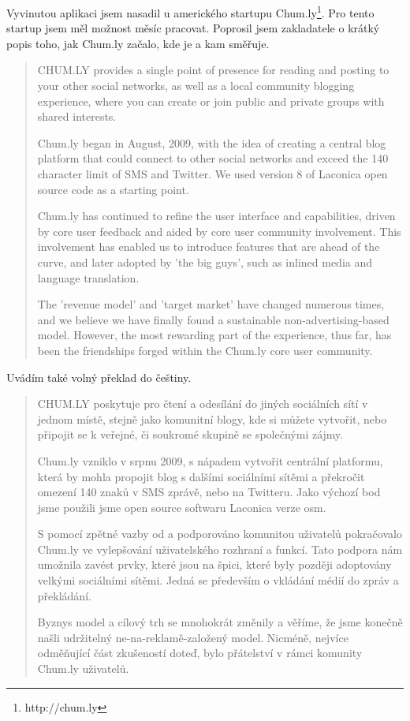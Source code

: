 \documentclass[bc,male,java,dept456]{diploma}						%
\begin{document}
Vyvinutou aplikaci jsem nasadil u amerického startupu Chum.ly\footnote{http://chum.ly}. Pro tento startup jsem měl možnost měsíc pracovat. Poprosil jsem zakladatele o krátký popis toho, jak Chum.ly začalo, kde je a kam směřuje.

\begin{quotation}
CHUM.LY provides a single point of presence for reading and posting to your other social networks, as well as a local community blogging experience, where you can create or join public and private groups with shared interests.

Chum.ly began in August, 2009, with the idea of creating a central blog platform that could connect to other social networks and exceed the 140 character limit of SMS and Twitter. We used version 8 of Laconica open source code as a starting point.

Chum.ly has continued to refine the user interface and capabilities, driven by core user feedback and aided by core user community involvement. This involvement has enabled us to introduce features that are ahead of the curve, and later adopted by 'the big guys', such as inlined media and language translation. 

The 'revenue model' and 'target market' have changed numerous times, and we believe we have finally found a sustainable non-advertising-based model. However, the most rewarding part of the experience, thus far, has been the friendships forged within the Chum.ly core user community.
\end{quotation}

Uvádím také volný překlad do češtiny.


\begin{quote}
CHUM.LY poskytuje pro čtení a odesílání do jiných sociálních sítí v jednom místě, stejně jako komunitní blogy, kde si můžete vytvořit, nebo připojit se k veřejné, či soukromé skupině se společnými zájmy.

Chum.ly vzniklo v srpnu 2009, s nápadem vytvořit centrální platformu, která by mohla propojit blog s dalšími sociálními sítěmi a překročit omezení 140 znaků v SMS zprávě, nebo na Twitteru. Jako výchozí bod jsme použili jsme open source softwaru Laconica verze osm.

S pomocí zpětné vazby od a podporováno komunitou uživatelů pokračovalo Chum.ly ve vylepšování uživatelského rozhraní a funkcí. Tato podpora nám umožnila zavést prvky, které jsou na špici, které byly později adoptovány velkými sociálními sítěmi. Jedná se především o vkládání médií do zpráv a překládání.

Byznys model a cílový trh se mnohokrát změnily a věříme, že jsme konečně našli udržitelný ne-na-reklamě-založený model. Nicméně, nejvíce odměňující část zkušeností doteď, bylo přátelství v rámci komunity Chum.ly uživatelů.
\end{quote}
\end{document}
